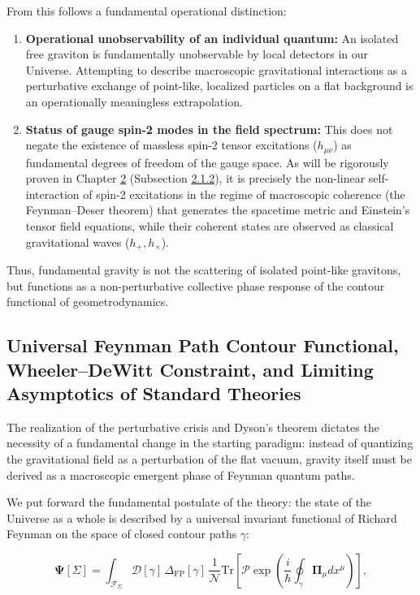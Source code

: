 \documentclass[11pt,a4paper]{article}
\theoremstyle{definition}
\begin{document}
From this follows a fundamental operational distinction:
\begin{enumerate}
\item \textbf{Operational unobservability of an individual quantum:} An isolated free graviton is fundamentally unobservable by local detectors in our Universe. Attempting to describe macroscopic gravitational interactions as a perturbative exchange of point-like, localized particles on a flat background is an operationally meaningless extrapolation.
\item \textbf{Status of gauge spin-2 modes in the field spectrum:} This does not negate the existence of massless spin-2 tensor excitations ($h_{\mu\nu}$) as fundamental degrees of freedom of the gauge space. As will be rigorously proven in Chapter \hyperref[sec:rozdil2]{2} (Subsection \hyperref[sec:2.1.2]{2.1.2}), it is precisely the non-linear self-interaction of spin-2 excitations in the regime of macroscopic coherence (the Feynman--Deser theorem) that generates the spacetime metric and Einstein's tensor field equations, while their coherent states are observed as classical gravitational waves ($h_+, h_\times$).
\end{enumerate}

Thus, fundamental gravity is not the scattering of isolated point-like gravitons, but functions as a non-perturbative collective phase response of the contour functional of geometrodynamics.


\subsection{Universal Feynman Path Contour Functional, Wheeler--DeWitt Constraint, and Limiting Asymptotics of Standard Theories}\label{sec:1.2}

The realization of the perturbative crisis and Dyson's theorem dictates the necessity of a fundamental change in the starting paradigm: instead of quantizing the gravitational field as a perturbation of the flat vacuum, gravity itself must be derived as a macroscopic emergent phase of Feynman quantum paths.

We put forward the fundamental postulate of the theory: the state of the Universe as a whole is described by a universal invariant functional of Richard Feynman on the space of closed contour paths $\gamma$:

\begin{equation}\label{eq:1.26}\tag{1.26}
\mathbf{\Psi}[\Sigma] = \int_{\mathcal{F}_\Sigma} \mathcal{D}[\gamma] \, \Delta_{\text{FP}}[\gamma] \, \frac{1}{\mathcal{N}} \text{Tr}\left[ \mathcal{P}\exp\left( \frac{i}{\hbar} \oint_{\gamma} \mathbf{\Pi}_\mu dx^\mu \right) \right],
\end{equation}
\end{document}
